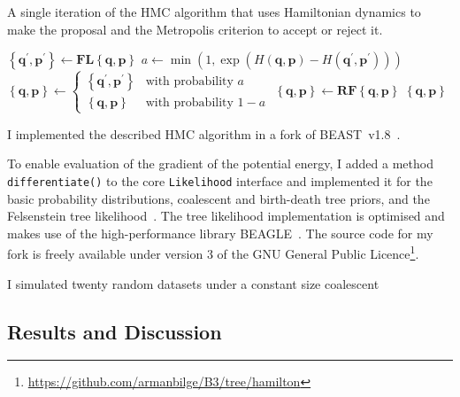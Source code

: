 \documentclass{article}
\renewcommand{\vec}[1]{\ensuremath{\boldsymbol{\mathbf{#1}}}}
\newcommand{\op}[1]{\ensuremath{\boldsymbol{\mathbf{#1}}}}
\begin{document}
    \begin{algorithm}
        \caption{A single iteration of the \acl{HMC} algorithm that uses
                 Hamiltonian dynamics to make the proposal and the Metropolis
                 criterion to accept or reject it.}
        \begin{algorithmic}[1]
        \Function {HamiltonUpdate}{$\left\{\vec{q},\vec{p}\right\}$}
            \State $\left\{\vec{q}^\prime, \vec{p}^\prime\right\}
                \leftarrow \op{F}\op{L}\left\{\vec{q},\vec{p}\right\}$
            \State $a \leftarrow \min\left(1,
                \exp\left(
                    H\left(\vec{q}, \vec{p}\right) - H\left(\vec{q}^\prime,
                        \vec{p}^\prime\right)\right)\right)$
            \State $\left\{\vec{q},\vec{p}\right\} \leftarrow
                \begin{cases}
                    \left\{\vec{q}^\prime, \vec{p}^\prime\right\}
                        & \text{with probability } a \\
                    \left\{\vec{q},\vec{p}\right\}
                        & \text{with probability } 1 - a
                \end{cases}$
            \State $\left\{\vec{q},\vec{p}\right\} \leftarrow
                        \op{R}\op{F}\left\{\vec{q},\vec{p}\right\}$
            \State \Return $\left\{\vec{q},\vec{p}\right\}$
        \EndFunction
        \end{algorithmic}
    \end{algorithm}

    I implemented the described \ac{HMC} algorithm in a fork of
        BEAST~v1.8~\cite{Dru+12}.

    To enable evaluation of the gradient of the potential energy, I added a
        method \texttt{differentiate()} to the core \texttt{Likelihood}
        interface and implemented it for the basic probability distributions,
        coalescent and birth-death tree priors, and the Felsenstein tree
        likelihood~\cite{Fel81}.
    The tree likelihood implementation is optimised and makes use of the
        high-performance library BEAGLE~\cite{Ayr+12}.
    The source code for my fork is freely available under version 3 of the GNU
        General Public
        Licence\footnote{\url{https://github.com/armanbilge/B3/tree/hamilton}}.

    I simulated twenty random datasets under a constant size coalescent

    \subsection*{Results and Discussion}
\end{document}
